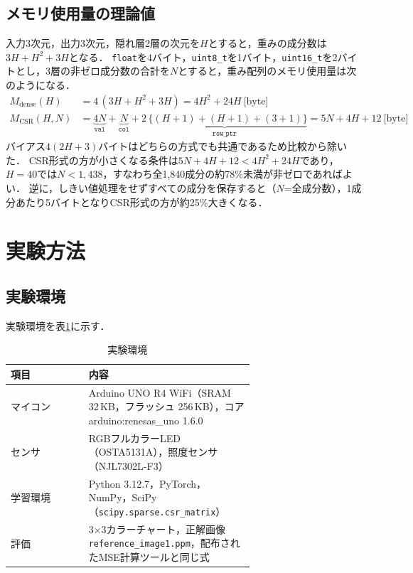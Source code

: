 \documentclass[a4paper,11pt,uplatex,dvipdfmx]{jsarticle}
\begin{document}
\subsection{メモリ使用量の理論値}
入力3次元，出力3次元，隠れ層2層の次元を$H$とすると，重みの成分数は$3H + H^2 + 3H$となる．
\texttt{float}を4バイト，\texttt{uint8\_t}を1バイト，\texttt{uint16\_t}を2バイトとし，3層の非ゼロ成分数の合計を$N$とすると，重み配列のメモリ使用量は次のようになる．
\begin{align}
  M_{\mathrm{dense}}(H) &= 4\,(3H + H^2 + 3H) = 4H^2 + 24H \ \text{[byte]} \label{eq:mdense}\\
  M_{\mathrm{CSR}}(H, N) &= \underbrace{4N}_{\texttt{val}} + \underbrace{N}_{\texttt{col}}
     + \underbrace{2\,\{(H+1) + (H+1) + (3+1)\}}_{\texttt{row\_ptr}} = 5N + 4H + 12 \ \text{[byte]} \label{eq:mcsr}
\end{align}
バイアス$4(2H+3)$バイトはどちらの方式でも共通であるため比較から除いた．
CSR形式の方が小さくなる条件は$5N + 4H + 12 < 4H^2 + 24H$であり，$H=40$では$N < 1{,}438$，すなわち全1{,}840成分の約78\%未満が非ゼロであればよい．
逆に，しきい値処理をせずすべての成分を保存すると（$N$=全成分数），1成分あたり5バイトとなりCSR形式の方が約25\%大きくなる．

\section{実験方法}
\subsection{実験環境}
実験環境を表\ref{tab:env}に示す．

\begin{table}[H]
  \centering
  \caption{実験環境}
  \label{tab:env}
  \begin{tabular}{lp{0.68\linewidth}}
    \toprule
    項目 & 内容 \\
    \midrule
    マイコン & Arduino UNO R4 WiFi（SRAM 32\,KB，フラッシュ 256\,KB），コア arduino:renesas\_uno 1.6.0 \\
    センサ & RGBフルカラーLED（OSTA5131A），照度センサ（NJL7302L-F3）\cite{njl7302} \\
    学習環境 & Python 3.12.7，PyTorch，NumPy，SciPy（\texttt{scipy.sparse.csr\_matrix}） \\
    評価 & 3$\times$3カラーチャート，正解画像\texttt{reference\_image1.ppm}，配布されたMSE計算ツールと同じ式 \\
    \bottomrule
  \end{tabular}
\end{table}
\end{document}
